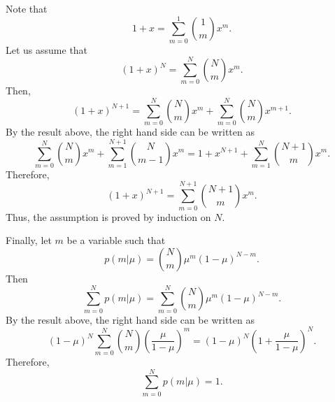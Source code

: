 Note that 
%
\begin{equation}
1 + x = \sum_{m = 0}^{1} {1 \choose m} x ^ m.
\end{equation}
%
Let us assume that 
%
\begin{equation}
(1 + x) ^ N = \sum_{m = 0}^{N} {N \choose m} x ^ m.
\end{equation}
%
Then,
%
\begin{equation}
(1 + x) ^ {N + 1} = \sum_{m = 0}^{N} {N \choose m} x ^ m + \sum_{m = 0}^{N} {N \choose m} x ^ {m + 1}.
\end{equation}
%
By the result above, the right hand side can be written as
%
\begin{equation}
\sum_{m = 0}^{N} {N \choose m} x ^ m + \sum_{m = 1}^{N + 1} {N \choose m - 1} x ^ m = 1 + x ^ {N + 1} + \sum_{m = 1}^{N} {N + 1 \choose m} x ^ m.
\end{equation}
%
Therefore,
%
\begin{equation}
(1 + x) ^ {N + 1} = \sum_{m = 0}^{N + 1} {N + 1 \choose m} x ^ m.
\end{equation}
%
Thus, the assumption is proved by induction on $N$.

Finally, let $m$ be a variable such that
%
\begin{equation}
p(m | \mu) = {N \choose m} \mu ^ m (1 - \mu) ^ {N - m}.
\end{equation}
%
Then
%
\begin{equation}
\sum_{m = 0}^{N} p(m | \mu) = \sum_{m = 0}^{N} {N \choose m} \mu ^ m (1 - \mu) ^ {N - m}.
\end{equation}
%
By the result above, the right hand side can be written as
%
\begin{equation}
(1 - \mu) ^ N \sum_{m = 0}^{N} {N \choose m} \left( \frac{\mu}{1 - \mu} \right) ^ m = (1 - \mu) ^ N \left( 1 + \frac{\mu}{1 - \mu} \right) ^ N.
\end{equation}
%
Therefore,
%
\begin{equation}
\sum_{m = 0}^{N} p(m | \mu) = 1.
\end{equation}
%


